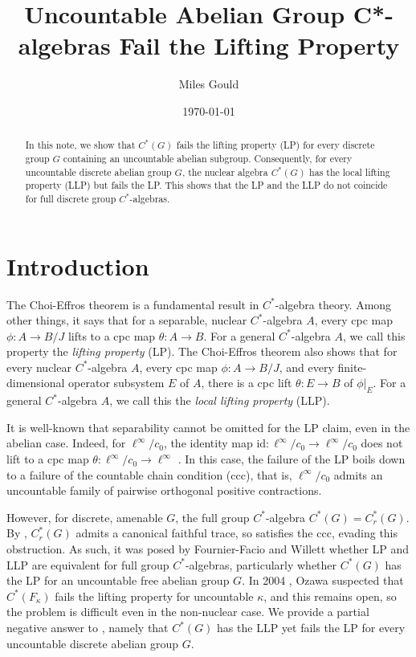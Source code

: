 \documentclass[10pt]{amsart}
\title{Uncountable Abelian Group C*-algebras Fail the Lifting Property}
\author{Miles Gould}
\date{\today}
\theoremstyle{definition}
\begin{document}
\begin{abstract}
    In this note, we show that $C^*(G)$ fails the lifting property (LP) for every discrete group $G$ containing an uncountable abelian subgroup. Consequently, for every uncountable discrete abelian group $G$, the nuclear algebra $C^*(G)$ has the local lifting property (LLP) but fails the LP. This shows that the LP and the LLP do not coincide for full discrete group $C^*$-algebras.
\end{abstract}

\maketitle

\section{Introduction}

The Choi-Effros theorem \cite{CE76} is a fundamental result in $C^*$-algebra theory. Among other things, it says that for a separable, nuclear $C^*$-algebra $A$, every cpc map $\phi:A\rightarrow B/J$ lifts to a cpc map $\theta:A\rightarrow B$. For a general $C^*$-algebra $A$, we call this property the \textit{lifting property} (LP). The Choi-Effros theorem also shows that for every nuclear $C^*$-algebra $A$, every cpc map $\phi: A\rightarrow B/J$, and every finite-dimensional operator subsystem $E$ of $A$, there is a cpc lift $\theta: E\rightarrow B$ of $\phi|_E$.
For a general $C^*$-algebra $A$, we call this the \textit{local lifting property} (LLP).

It is well-known that separability cannot be omitted for the LP claim, even in the abelian case. Indeed, for $\ell^\infty/c_0$, the identity map $\mathrm{id}:\ell^\infty/c_0\rightarrow \ell^\infty/c_0$ does not lift to a cpc map $\theta:\ell^\infty/c_0\rightarrow \ell^\infty$ \cite[\S 3]{OZA}. In this case, the failure of the LP boils down to a failure of the countable chain condition (ccc), that is, $\ell^\infty/c_0$ admits an uncountable family of pairwise orthogonal positive contractions.

However, for discrete, amenable $G$, the full group $C^*$-algebra $C^*(G)=C^*_r(G)$. By \cite[2.5.3]{BROZ}, $C^*_r(G)$ admits a canonical faithful trace, so satisfies the ccc, evading this obstruction. As such, it was posed by Fournier-Facio and Willett \cite[1.13]{WIL} whether LP and LLP are equivalent for full group $C^*$-algebras, particularly whether $C^*(G)$ has the LP for an uncountable free abelian group $G$. In 2004 \cite[\S 3]{OZA}, Ozawa suspected that $C^*(F_\kappa)$ fails the lifting property for uncountable $\kappa$, and this remains open, so the problem is difficult even in the non-nuclear case. We provide a partial negative answer to \cite[1.13]{WIL}, namely that $C^*(G)$ has the LLP yet fails the LP for every uncountable discrete abelian group $G$.
\end{document}
